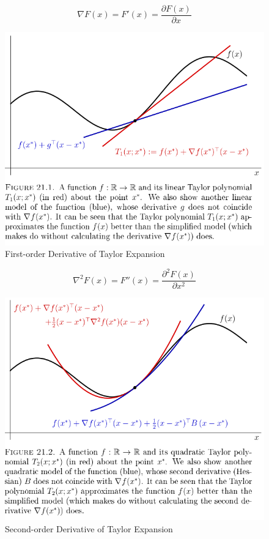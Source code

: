\documentclass[a4paper]{report}
\numberwithin{figure}{section}
\begin{document}
\begin{equation}
  \nabla F(x) = F'(x) = \frac{\partial F(x)}{\partial x}
\end{equation}

\begin{figure}[H]
	\centering
	\includegraphics[width=\linewidth,natwidth=640,natheight=640]
	{fig/ref_imgs/taylor_1st_derivative.png}
	\caption{First-order Derivative of Taylor Expansion}
  \label{fig:taylor_1st_derivative}
\end{figure}



\begin{equation}
  \nabla^2 F(x) = F''(x) = \frac{\partial^2 F(x)}{\partial x^2}
\end{equation}

\begin{figure}[H]
	\centering
	\includegraphics[width=\linewidth,natwidth=640,natheight=640]
	{fig/ref_imgs/taylor_2nd_derivative.png}
	\caption{Second-order Derivative of Taylor Expansion}
  \label{fig:taylor_2nd_derivative}
\end{figure}
\end{document}
